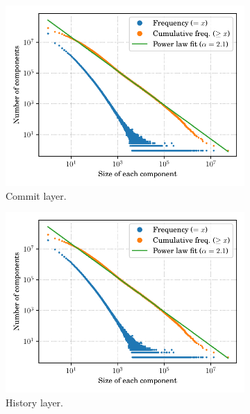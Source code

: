 \begin{figure}
    \begin{subfigure}{.49\textwidth}
        \includegraphics[width=\linewidth]{img/topology/connectedcomponents/rev}
        \caption{Commit layer.}%
        \label{fig:connectedcomponents_rev}
    \end{subfigure}\hfill
    \begin{subfigure}{.49\textwidth}
        \includegraphics[width=\linewidth]{img/topology/connectedcomponents/rel+rev}
        \caption{History layer.}%
        \label{fig:connectedcomponents_rel+rev}
    \end{subfigure}
    \newline
    \begin{subfigure}{.49\textwidth}

\end{subfigure}
\end{figure}
